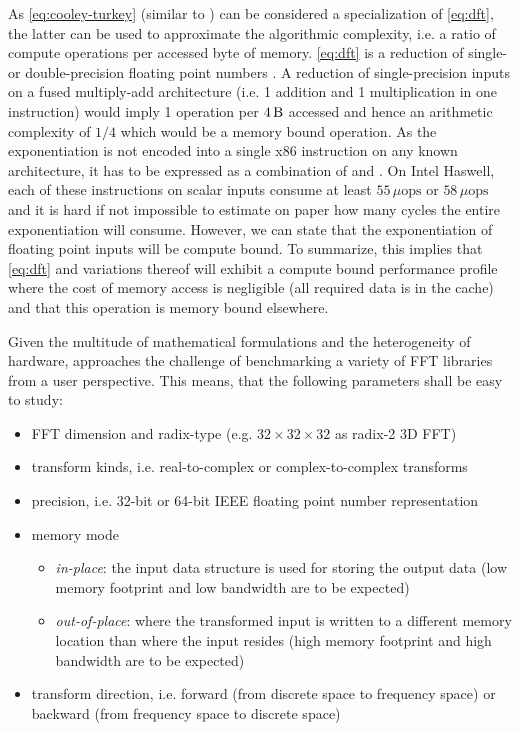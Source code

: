 As \cref{eq:cooley-turkey} (similar to \cite{bluestein,stockham1966high}) can be considered a specialization of \cref{eq:dft}, the latter can be used to approximate the algorithmic complexity, i.e. a ratio of compute operations per accessed byte of memory. \cref{eq:dft} is a reduction of single- or double-precision floating point numbers \cite{ieee2008754}. A reduction of single-precision inputs on a fused multiply-add architecture (i.e. 1 addition and 1 multiplication in one instruction) would imply 1 operation per $\SI{4}{\byte}$ accessed and hence an arithmetic complexity of $1/4$ which would be a memory bound operation. As the exponentiation is not encoded into a single x86 instruction on any known architecture, it has to be expressed as a combination of  and . On Intel Haswell, each of these instructions on scalar inputs consume at least $55\,\mu\text{ops}$ or $58\,\mu\text{ops}$ \cite{agnerfog} and it is hard if not impossible to estimate on paper how many cycles the entire exponentiation will consume. However, we can state that the exponentiation of floating point inputs will be compute bound. To summarize, this implies that \cref{eq:dft} and variations thereof will exhibit a compute bound performance profile where the cost of memory access is negligible (all required data is in the cache) and that this operation is memory bound elsewhere.  

Given the multitude of mathematical formulations and the heterogeneity of hardware, \gearshifft{} approaches the challenge of benchmarking a variety of FFT libraries from a user perspective. This means, that the following parameters shall be easy to study:

\begin{itemize}
\item FFT dimension and radix-type (e.g. $32{\times}32{\times}32$ as radix-2 3D FFT)
\item transform kinds, i.e. real-to-complex or complex-to-complex transforms
\item precision, i.e. 32-bit or 64-bit IEEE floating point number representation
\item memory mode
  \begin{itemize}
  \item \emph{in-place}: the input data structure is used for storing the output data (low memory footprint and low bandwidth are to be expected)
  \item \emph{out-of-place}:  where the transformed input is written to a different memory location than where the input resides (high memory footprint and high bandwidth are to be expected)
  \end{itemize}
\item transform direction, i.e. forward (from discrete space to frequency space) or backward (from frequency space to discrete space)
\end{itemize}
 
